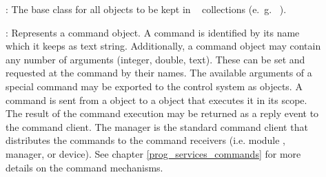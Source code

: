 

\begin{description}

\item[] :  The base class for all objects to be kept in \dabc~ collections (e.~g.~ ).

\item[] : 
Represents a command object. A command 
   is identified by its name which it keeps as text string. Additionally, 
   a command object may contain any number of arguments (integer, double, text). 
   These can be set and requested at the command by their names. 
   The available arguments of a special command may be exported to the control 
   system as  objects. A command is sent from a 
    object to a  object
    that executes it in its scope. 
   The result of the command execution may be returned as a reply event to 
   the command client. The manager is the standard command client 
   that distributes the commands to the command receivers 
   (i.e. module , manager, or device). See chapter \ref{prog_services_commands}
   for more details on the command mechanisms.


\end{description}
